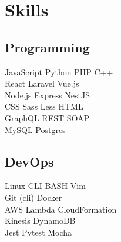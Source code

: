 \documentclass[]{pb-resume-openfonts}
\begin{document}
\begin{minipage}[t]{0.33\textwidth}

\section{Skills}
\subsection{Programming}
JavaScript \textbullet{}  Python \textbullet{}  PHP \textbullet{} C++ \\
React \textbullet{}  Laravel \textbullet{}  Vue.js {} \\
Node.js \textbullet{}  Express \textbullet{} NestJS \\ 
CSS \textbullet{} Sass \textbullet{} Less \textbullet{} HTML \\
GraphQL \textbullet{} REST \textbullet{}  SOAP \\
MySQL \textbullet{}  Postgres
\sectionsep

\subsection{DevOps}
Linux CLI \textbullet{}  BASH \textbullet{}  Vim \\
Git (cli) \textbullet{} Docker \\
AWS \textbullet{} Lambda \textbullet{} CloudFormation  \\
Kinesis \textbullet{} DynamoDB  \\
Jest \textbullet{} Pytest \textbullet{} Mocha 
\sectionsep

%
%

\end{minipage} 
\hfill
\end{document}
